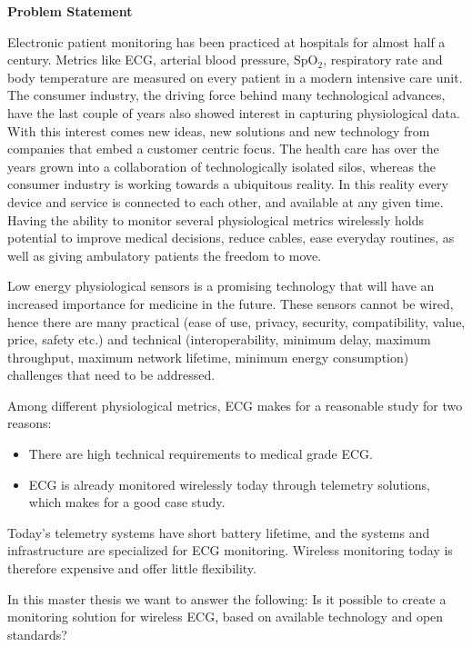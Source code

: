 \noindent
\textbf{Problem Statement} 
\newline 
	
\noindent 
Electronic patient monitoring has been practiced at hospitals for almost half a century. Metrics like ECG, arterial blood pressure, SpO$_2$, respiratory rate and body temperature are measured on every patient in a modern intensive care unit. The consumer industry, the driving force behind many technological advances, have the last couple of years also showed interest in capturing physiological data. With this interest comes new ideas, new solutions and new technology from companies that embed a customer centric focus. The health care has over the years grown into a collaboration of technologically isolated silos, whereas the consumer industry is working towards a ubiquitous reality. In this reality every device and service is connected to each other, and available at any given time. Having the ability to monitor several physiological metrics wirelessly holds potential to improve medical decisions, reduce cables, ease everyday routines, as well as giving ambulatory patients the freedom to move. 
	
	Low energy physiological sensors is a promising technology that will have an increased importance for medicine in the future. These sensors cannot be wired, hence there are many practical (ease of use, privacy, security, compatibility, value, price, safety etc.) and technical (interoperability, minimum delay, maximum throughput, maximum network lifetime, minimum energy consumption) challenges that need to be addressed.
	
	Among different physiological metrics, ECG makes for a reasonable study for two reasons: 
	\begin{itemize}
		\item There are high technical requirements to medical grade ECG. 
		\item ECG is already monitored wirelessly today through telemetry solutions, which makes for a good case study. 
	\end{itemize}

\noindent	
Today's telemetry systems have short battery lifetime, and the systems and infrastructure are specialized for ECG monitoring. Wireless monitoring today is therefore expensive and offer little flexibility. 

In this master thesis we want to answer the following: Is it possible to create a monitoring solution for wireless ECG, based on available technology and open standards?